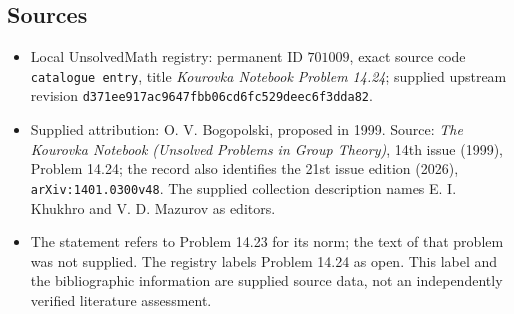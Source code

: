 \documentclass[11pt]{article}
\begin{document}
\subsection{Sources}
\begin{itemize}
\item Local UnsolvedMath registry: permanent ID \(701009\), exact source code \texttt{catalogue entry}, title \emph{Kourovka Notebook Problem 14.24}; supplied upstream revision \texttt{d371ee917ac9647fbb06cd6fc529deec6f3dda82}.
\item Supplied attribution: O. V. Bogopolski, proposed in 1999. Source: \emph{The Kourovka Notebook (Unsolved Problems in Group Theory)}, 14th issue (1999), Problem 14.24; the record also identifies the 21st issue edition (2026), \texttt{arXiv:1401.0300v48}. The supplied collection description names E. I. Khukhro and V. D. Mazurov as editors.
\item The statement refers to Problem 14.23 for its norm; the text of that problem was not supplied. The registry labels Problem 14.24 as open. This label and the bibliographic information are supplied source data, not an independently verified literature assessment.
\end{itemize}
\end{document}
